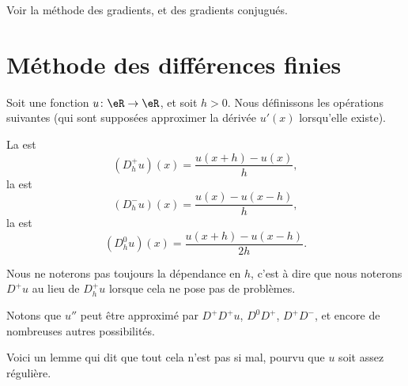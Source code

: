 Voir la méthode des gradients, et des gradients conjugués.

\section{Méthode des différences finies}

Soit une fonction \( u\colon \eR\to \eR\), et soit \( h>0\). Nous définissons les opérations suivantes (qui sont supposées approximer la dérivée \( u'(x)\) lorsqu'elle existe).

\begin{definition}
    La  est 
    \begin{equation}
        (D^+_hu)(x)=\frac{ u(x+h)-u(x) }{ h },
    \end{equation}
    la  est 
    \begin{equation}
        (D^-_hu)(x)=\frac{ u(x)-u(x-h) }{ h },
    \end{equation}
    la  est 
    \begin{equation}
        (D^0_hu)(x)=\frac{ u(x+h)-u(x-h) }{ 2h }.
    \end{equation}
\end{definition}
Nous ne noterons pas toujours la dépendance en \( h\), c'est à dire que nous noterons \( D^+u\) au lieu de \( D^+_hu\) lorsque cela ne pose pas de problèmes.

Notons que \( u''\) peut être approximé par \( D^+D^+u\), \( D^0D^+\), \( D^+D^-\), et encore de nombreuses autres possibilités.

Voici un lemme qui dit que tout cela n'est pas si mal, pourvu que \( u\) soit assez régulière.

